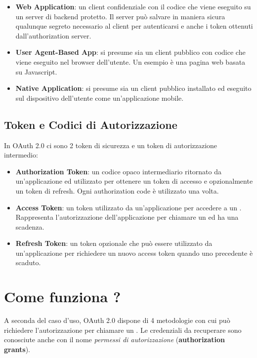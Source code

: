 \begin{itemize}
      \item \textbf{Web Application}: un client confidenziale con il codice che viene
            eseguito su un server di backend protetto. Il server può salvare in maniera
            sicura qualunque segreto necessario al client per autenticarsi e anche i
            token ottenuti dall'authorization server.
      \item \textbf{User Agent-Based App}: si presume sia un client pubblico con codice
            che viene eseguito nel browser dell'utente. Un esempio è una pagina web
            basata su Javascript.
      \item \textbf{Native Application}: si presume sia un client pubblico installato
            ed eseguito sul dispositivo dell'utente come un'applicazione mobile.
\end{itemize}

\subsection{Token e Codici di Autorizzazione}

In OAuth 2.0 ci sono 2 token di sicurezza e un token di autorizzazione intermedio:

\begin{itemize}
      \item \textbf{Authorization Token}: un codice opaco intermediario ritornato
            da un'applicazione ed utilizzato per ottenere un token di accesso e
            opzionalmente un token di refresh. Ogni authorization code è utilizzato
            una volta.
      \item \textbf{Access Token}: un token utilizzato da un'applicazione per accedere
            a un \api{}. Rappresenta l'autorizzazione dell'applicazione per chiamare un \api{}
            ed ha una scadenza.
      \item \textbf{Refresh Token}: un token opzionale che può essere utilizzato da
            un'applicazione per richiedere un nuovo access token quando uno precedente
            è scaduto.
\end{itemize}

\section{Come funziona ?}

A seconda del caso d'uso, OAuth 2.0 dispone di 4 metodologie con cui può richiedere
l'autorizzazione per chiamare un \api{}. Le credenziali da recuperare sono conosciute
anche con il nome \textit{permessi di autorizzazione} (\textbf{authorization grants}).

